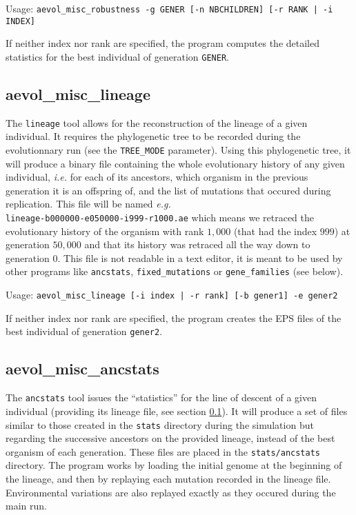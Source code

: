 Usage: \verb?aevol_misc_robustness -g GENER [-n NBCHILDREN] [-r RANK | -i INDEX]?

If neither index nor rank are specified, the program computes the detailed statistics for the best individual of generation \verb?GENER?.


\subsection{aevol\_misc\_lineage}
\label{sect:lineage}
The \verb?lineage? tool allows for the reconstruction of the lineage of a given individual. It requires the phylogenetic tree to be recorded during the evolutionnary run (see the \verb?TREE_MODE? parameter). Using this phylogenetic tree, it will produce a binary file containing the whole evolutionary history of any given individual, \emph{i.e.} for each of its ancestors, which organism in the previous generation it is an offspring of, and the list of mutations that occured during replication. This file will be named \emph{e.g.} \\\verb?lineage-b000000-e050000-i999-r1000.ae? which means we retraced the evolutionary history of the organism with rank $1,000$ (that had the index $999$) at generation $50,000$ and that its history was retraced all the way down to generation $0$. This file is not readable in a text editor, it is meant to be used by other programs like \verb?ancstats?, \verb?fixed_mutations? or \verb?gene_families? (see below).

Usage: \verb?aevol_misc_lineage [-i index | -r rank] [-b gener1] -e gener2?

If neither index nor rank are specified, the program creates the EPS files of the best individual of generation \verb?gener2?.


\subsection{aevol\_misc\_ancstats}
\label{sect:ancstats}
The \verb?ancstats? tool issues the ``statistics'' for the line of descent of a given individual (providing its lineage file, see section \ref{sect:lineage}). It will produce a set of files similar to those created in the \verb?stats? directory during the simulation but regarding the successive ancestors on the provided lineage, instead of the best organism of each generation. These files are placed in the \verb?stats/ancstats? directory. The program works by loading the initial genome at the beginning of the lineage, and then by replaying each mutation recorded in the lineage file. Environmental variations are also replayed exactly as they occured during the main run.

